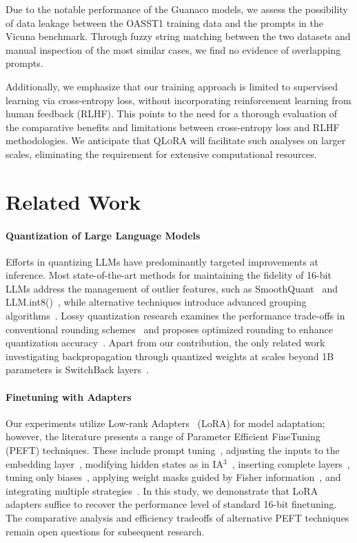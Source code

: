 Due to the notable performance of the {Guanaco} models, we assess the possibility of data leakage between the OASST1 training data and the prompts in the Vicuna benchmark. Through fuzzy string matching between the two datasets and manual inspection of the most similar cases, we find no evidence of overlapping prompts.

Additionally, we emphasize that our training approach is limited to supervised learning via cross-entropy loss, without incorporating reinforcement learning from human feedback (RLHF). This points to the need for a thorough evaluation of the comparative benefits and limitations between cross-entropy loss and RLHF methodologies. We anticipate that \textsc{QLoRA} will facilitate such analyses on larger scales, eliminating the requirement for extensive computational resources.

\section{Related Work}

\paragraph{Quantization of Large Language Models} Efforts in quantizing LLMs have predominantly targeted improvements at inference. Most state-of-the-art methods for maintaining the fidelity of 16-bit LLMs address the management of outlier features, such as SmoothQuant~\citep{xiao2022smoothquant} and LLM.int8()~\citep{dettmers2022llm}, while alternative techniques introduce advanced grouping algorithms~\citep{park2022nuqmm, yao2022zeroquant}. Lossy quantization research examines the performance trade-offs in conventional rounding schemes~\citep{dettmers2022case,zeng2022glm,pope2022efficiently} and proposes optimized rounding to enhance quantization accuracy~\citep{frantar2022gptq}. Apart from our contribution, the only related work investigating backpropagation through quantized weights at scales beyond 1B parameters is SwitchBack layers~\citep{wortsman2023stable}.

\paragraph{Finetuning with Adapters} Our experiments utilize Low-rank Adapters~\citep{hu2021lora} (LoRA) for model adaptation; however, the literature presents a range of Parameter Efficient FineTuning (PEFT) techniques. These include prompt tuning~\citep{qin2021learning,lester2021power,li2021prefix}, adjusting the inputs to the embedding layer~\citep{an2022input}, modifying hidden states as in IA$^3$~\citep{liu2022few}, inserting complete layers~\citep{houlsby2019parameter}, tuning only biases~\citep{zaken2021bitfit}, applying weight masks guided by Fisher information~\citep{sung2021training}, and integrating multiple strategies~\citep{henderson2021compacter}. In this study, we demonstrate that LoRA adapters suffice to recover the performance level of standard 16-bit finetuning. The comparative analysis and efficiency tradeoffs of alternative PEFT techniques remain open questions for subsequent research.

